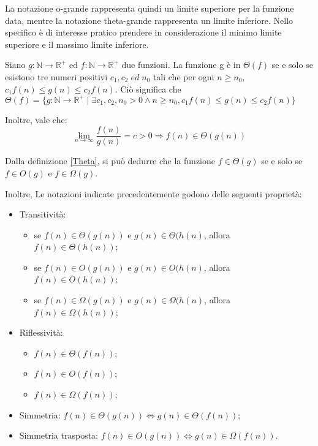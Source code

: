   La notazione o-grande rappresenta quindi un limite superiore per la funzione data, mentre la notazione theta-grande rappresenta un limite inferiore. Nello specifico è di interesse pratico prendere in considerazione il minimo limite superiore e il massimo limite inferiore.

  \begin{definition}  \label{Theta}
    Siano \(g:\mathbb{N}\to\mathbb{R}^+\) ed \(f:\mathbb{N}\to\mathbb{R}^+\) due funzioni. La funzione g è in \(\Theta(f)\) se e solo se esistono tre numeri positivi \(c_1, c_2\;ed\; n_0\) tali che per ogni \(n \ge n_0\), \(c_1f(n)\le g(n)\le c_2f(n)\). Ciò significa che \(\Theta(f)=\{g:\mathbb{N}\to\mathbb{R}^+\;|\;\exists c_1,c_2,n_0>0 \land n\ge n_0, c_1f(n)\le g(n)\le c_2f(n)\}\)
    
    Inoltre, vale che:
    \begin{equation*}
      \lim_{n\to \infty}\frac{f(n)}{g(n)}=c>0 \Rightarrow f(n) \in \Theta(g(n))
    \end{equation*}
  \end{definition}

  \noindent Dalla definizione \ref{Theta}, si può dedurre che la funzione \(f\in\Theta(g)\) se e solo se \(f\in O(g)\) e \(f\in \Omega(g)\).

  Inoltre, Le notazioni indicate precedentemente godono delle seguenti proprietà:
  \begin{itemize}
    \item Transitività:
    \begin{itemize}
      \item se \(f(n)\in\Theta(g(n))\) e \(g(n)\in\Theta(h(n)\), allora \(f(n)\in\Theta(h(n))\);
      \item se \(f(n)\in O(g(n))\) e \(g(n)\in O(h(n)\), allora \(f(n)\in O(h(n))\);
      \item se \(f(n)\in\Omega(g(n))\) e \(g(n)\in\Omega(h(n)\), allora \(f(n)\in\Omega(h(n))\);
    \end{itemize}
    \item Riflessività:
    \begin{itemize}
      \item \(f(n)\in\Theta(f(n))\);
      \item \(f(n)\in O(f(n))\);
      \item \(f(n)\in\Omega(f(n))\);
    \end{itemize}
    \item Simmetria: \(f(n)\in\Theta(g(n))\iff g(n)\in\Theta(f(n))\);
    \item Simmetria trasposta: \(f(n)\in O(g(n))\iff g(n)\in\Omega(f(n))\).
  \end{itemize}

